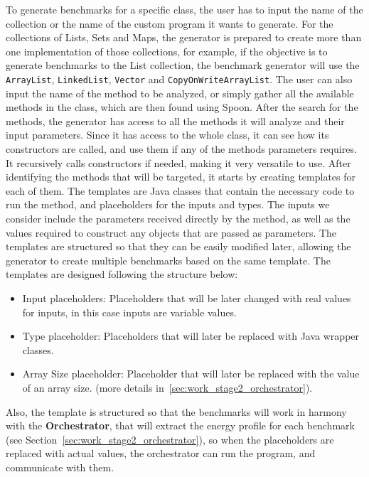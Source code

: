 {\color{blue}To generate benchmarks for a specific class, the user has to input the name of the collection or the name of the custom program it wants to generate. For the collections of Lists, Sets and Maps, the generator is prepared to create more than one implementation of those collections, for example, if the objective is to generate benchmarks to the List collection, the benchmark generator will use the \texttt{ArrayList}, \texttt{LinkedList}, \texttt{Vector} and \texttt{CopyOnWriteArrayList}. The user can also input the name of the method to be analyzed, or simply gather all the available methods in the class, which are then found using Spoon.
After the search for the methods, the generator has access to all the methods it will analyze and their input parameters. }
Since it has access to the whole class, it can see how its constructors are called, and use them if any of the methods parameters requires. 
It recursively calls constructors if needed, making it very versatile to use. After identifying the methods that will be targeted, it starts by creating templates for each of them. The templates are Java classes that contain the necessary code to run the method, and placeholders for the inputs and types. The inputs we consider include the parameters received directly by the method, as well as the values required to construct any objects that are passed as parameters. The templates are structured so that they can be easily modified later, allowing the generator to create multiple benchmarks based on the same template. The templates are designed following the structure below:

\begin{itemize}

\item Input placeholders: Placeholders that will be later changed with real values for inputs, in this case inputs are variable values. 

\item Type placeholder: Placeholders that will later be replaced with Java wrapper classes.
  
\item Array Size placeholder: Placeholder that will later be replaced with the value of an array size. (more details in~\ref{sec:work_stage2_orchestrator}). 

\end{itemize}

Also, the template is structured so that the benchmarks will work in harmony with the \textbf{Orchestrator}, that will extract the energy profile for each benchmark (see Section~\ref{sec:work_stage2_orchestrator}), so when the placeholders are replaced with actual values, the orchestrator can run the program, and communicate with them.


